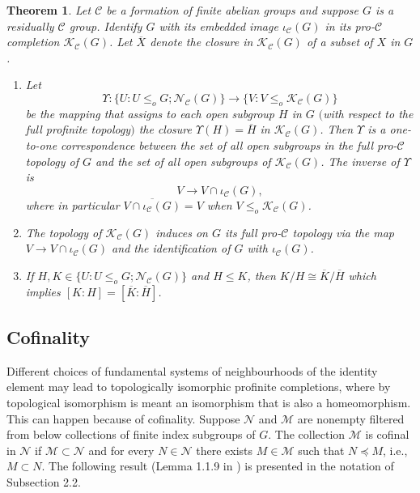 \documentclass{amsart}
\theoremstyle{plain}
\newtheorem{theorem}{Theorem}[section]
\theoremstyle{definition}
\theoremstyle{remark}
\begin{document}
\begin{theorem}\label{fullproCtopology} Let ${\mathcal C}$ be a formation of finite abelian groups and suppose $G$ is a residually ${\mathcal C}$ group. Identify $G$ with its embedded image $\iota_{\mathcal C}(G)$ in its pro-${\mathcal C}$ completion ${\mathcal K}_{\mathcal C}(G)$. Let $\overline{X}$ denote the closure in ${\mathcal K}_{\mathcal C}(G)$ of a subset of $X$ in $G$.
\begin{enumerate}
\item[(a)] Let
\[ \Upsilon: \{ U: U \leq_o G; {\mathcal N}_{\mathcal C}(G)\} \to \{ V: V \leq_o {\mathcal K}_{\mathcal C}(G) \}\]
be the mapping that assigns to each open subgroup $H$ in $G$ $($with respect to the full profinite topology$)$ the closure $\Upsilon(H)=\overline{H}$ in ${\mathcal K}_{\mathcal C}(G)$. Then $\Upsilon$ is a one-to-one correspondence between the set of all open subgroups in the full pro-${\mathcal C}$ topology of $G$ and the set of all open subgroups of ${\mathcal K}_{\mathcal C}(G)$.
The inverse of $\Upsilon$ is
\[ V\to V\cap\iota_{\mathcal C}(G),\]
where in particular $\overline{ V\cap \iota_{\mathcal C}(G)} = V$ when
$V \leq_o {\mathcal K}_{\mathcal C}(G)$. 
\item[(b)] The topology of ${\mathcal K}_{\mathcal C}(G)$ induces on $G$ its full pro-${\mathcal C}$ topology via the map $V \to V\cap \iota_{\mathcal C}(G)$ and the identification of $G$ with $\iota_{\mathcal C}(G)$.
\item[(c)] If $H,K \in \{ U : U \leq_o G; {\mathcal N}_{\mathcal C}(G)\}$ and $H \leq K$, then $K/H \cong \overline{K}/\overline{H}$ which implies $[K:H] = [\overline {K}:\overline{H}]$.
\end{enumerate}
\end{theorem}


\subsection{Cofinality}

Different choices of fundamental systems of neighbourhoods of the identity element may lead to topologically isomorphic profinite completions, where by topological isomorphism is meant an isomorphism that is also a homeomorphism. This can happen because of cofinality. Suppose ${\mathcal N}$ and ${\mathcal M}$ are nonempty filtered from below collections of finite index subgroups of $G$. The collection ${\mathcal M}$ is cofinal in ${\mathcal N}$ if ${\mathcal M} \subset {\mathcal N}$ and for every $N\in {\mathcal N}$ there exists $M\in {\mathcal M}$ such that $N \preceq M$, i.e., $M\subset N$. The following result (Lemma 1.1.9 in \cite{RZ10}) is presented in the notation of Subsection 2.2.
\end{document}
